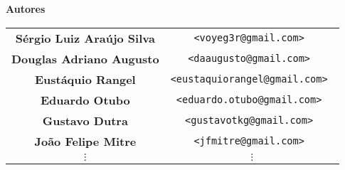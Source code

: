 \documentclass[10pt,a4paper,openany]{book}
\begin{document}
\newpage
\thispagestyle{empty}

\begin{center}
{\Huge \bf Autores}

\vspace{2cm}

\begin{tabular}{cc}
\bf Sérgio Luiz Araújo Silva 	& \tt <voyeg3r@gmail.com> 			\\
\bf Douglas Adriano Augusto 	& \tt <daaugusto@gmail.com>			\\
\bf Eustáquio Rangel 			& \tt <eustaquiorangel@gmail.com> 	\\
\bf Eduardo Otubo 				& \tt <eduardo.otubo@gmail.com> 	\\
\bf Gustavo Dutra 				& \tt <gustavotkg@gmail.com> 		\\
\bf João Felipe Mitre 			& \tt <jfmitre@gmail.com> 			\\
$\vdots$ 						& $\vdots$ 							\\
\end{tabular}

\end{center}

\newpage
\tableofcontents

\setcounter{page}{0} %


















\fancyhf{} 
\fancyhead[LE,RO]{\bfseries\thepage}



% 

\clearpage
\fancyhf{} 


\fancyhf{} 
\fancyhead[LE,RO]{\bfseries\thepage}
\printindex
\end{document}
